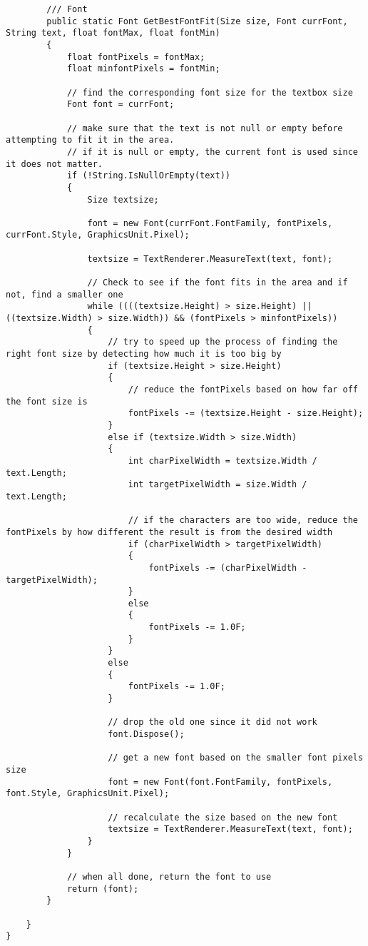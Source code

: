\begin{Verbatim}
        /// Font
        public static Font GetBestFontFit(Size size, Font currFont, String text, float fontMax, float fontMin)
        {
            float fontPixels = fontMax;
            float minfontPixels = fontMin;

            // find the corresponding font size for the textbox size
            Font font = currFont;

            // make sure that the text is not null or empty before attempting to fit it in the area.
            // if it is null or empty, the current font is used since it does not matter.
            if (!String.IsNullOrEmpty(text))
            {
                Size textsize;

                font = new Font(currFont.FontFamily, fontPixels, currFont.Style, GraphicsUnit.Pixel);

                textsize = TextRenderer.MeasureText(text, font);

                // Check to see if the font fits in the area and if not, find a smaller one
                while ((((textsize.Height) > size.Height) || ((textsize.Width) > size.Width)) && (fontPixels > minfontPixels))
                {
                    // try to speed up the process of finding the right font size by detecting how much it is too big by
                    if (textsize.Height > size.Height)
                    {
                        // reduce the fontPixels based on how far off the font size is
                        fontPixels -= (textsize.Height - size.Height);
                    }
                    else if (textsize.Width > size.Width)
                    {
                        int charPixelWidth = textsize.Width / text.Length;
                        int targetPixelWidth = size.Width / text.Length;

                        // if the characters are too wide, reduce the fontPixels by how different the result is from the desired width
                        if (charPixelWidth > targetPixelWidth)
                        {
                            fontPixels -= (charPixelWidth - targetPixelWidth);
                        }
                        else
                        {
                            fontPixels -= 1.0F;
                        }
                    }
                    else
                    {
                        fontPixels -= 1.0F;
                    }

                    // drop the old one since it did not work
                    font.Dispose();

                    // get a new font based on the smaller font pixels size
                    font = new Font(font.FontFamily, fontPixels, font.Style, GraphicsUnit.Pixel);

                    // recalculate the size based on the new font
                    textsize = TextRenderer.MeasureText(text, font);
                }
            }

            // when all done, return the font to use
            return (font);
        }

    }
}
\end{Verbatim}

